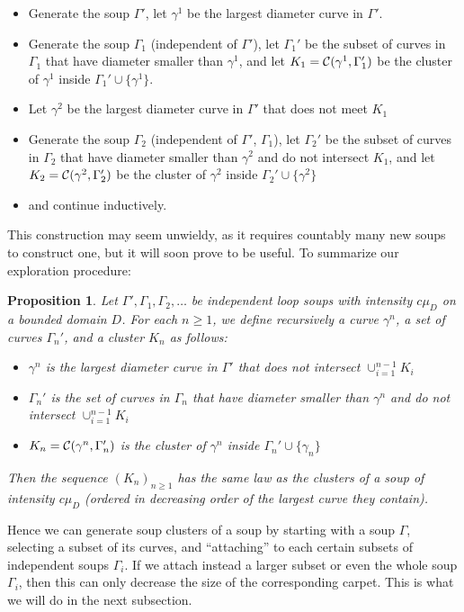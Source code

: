 \documentclass[11pt]{article}
\newtheorem {Proposition}[Theorem]    {Proposition}
\newcommand{\clus}[2]{{\cal C} ({#1},{#2})}
\begin{document}
\begin{itemize}
\item Generate the soup $\Gamma'$, let $\gamma^1$ be
the largest diameter curve in $\Gamma'$.
\item Generate the soup $\Gamma_1$ (independent of $\Gamma'$),
let $\Gamma_1'$ be the subset of curves in $\Gamma_1$ that 
have diameter smaller than $\gamma^1$, and let 
$K_1 = \clus{\gamma^1}{\Gamma_1'}$ be the cluster of
$\gamma^1$ inside $\Gamma_1' \cup \{\gamma^1\} $.
\item Let $\gamma^2$ be
the largest diameter curve in $\Gamma'$ that does not meet $K_1$
\item Generate the soup $\Gamma_2$ (independent of $\Gamma'$, $\Gamma_1$), 
let $\Gamma_2'$ be the subset of curves in $\Gamma_2$ that 
have diameter smaller than $\gamma^2$ and do not
intersect $K_1$, and let
$K_2 = \clus{\gamma^2}{\Gamma_2'}$ be the cluster of
$\gamma^2$ inside $\Gamma_2' \cup \{\gamma^2\}$
\item and continue inductively.
\end{itemize}
This construction may seem unwieldy, as it requires countably
many new soups to construct one, but it will soon prove to be useful.
To summarize our exploration procedure:

\begin{Proposition}\label{soup_via_many_soups}
Let $\Gamma', \Gamma_1, \Gamma_2, \ldots$ be independent loop soups
with intensity $c \mu_D$ on a bounded domain $D$.
For each $n \ge 1$,
we define recursively a curve $\gamma^n$, a set of curves $\Gamma_n'$,
and a cluster $K_n$ as follows:
\begin{itemize}
\item $\gamma^n$ is the largest diameter curve in $\Gamma'$
that does not intersect $\cup_{i=1}^{n-1} K_i$
\item $\Gamma_n'$ is the set of curves in $\Gamma_n$ that have diameter
smaller than $\gamma^n$ and do not intersect $\cup_{i=1}^{n-1} K_i$
\item $K_n = \clus{\gamma^n}{\Gamma_n'}$ is the cluster of
$\gamma^n$ inside $\Gamma_n' \cup \{\gamma_n\}$
\end{itemize}
Then the sequence $(K_n)_{n\ge 1}$ has the same law as the clusters
of a soup of intensity $c\mu_D$ (ordered in decreasing order of
the largest curve they contain).
\end{Proposition}

Hence we can generate soup clusters of a soup by starting with a soup
$\Gamma$, selecting a subset of its curves,
and ``attaching'' to each certain subsets of independent soups $\Gamma_i$. 
If we attach instead
a larger subset or even the whole soup $\Gamma_i$, 
then this can only decrease the size of the corresponding carpet. 
This is what we will do in the next subsection. 
\end{document}

